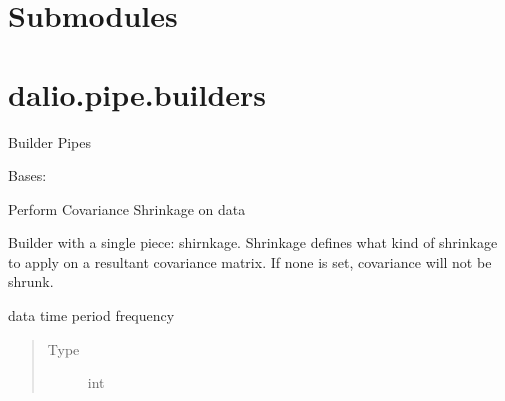 \documentclass[letterpaper,10pt,english]{sphinxmanual}
\begin{document}
\section{Submodules}
\label{\detokenize{dalio.pipe:submodules}}

\section{dalio.pipe.builders}
\label{\detokenize{dalio.pipe:module-dalio.pipe.builders}}\label{\detokenize{dalio.pipe:dalio-pipe-builders}}
Builder Pipes

\begin{fulllineitems}
\label{\detokenize{dalio.pipe:dalio.pipe.builders.CovShrink}}
Bases: {\hyperref[\detokenize{dalio.pipe:dalio.pipe.pipe.PipeBuilder}]{}}

Perform Covariance Shrinkage on data

Builder with a single piece: shirnkage. Shrinkage defines what kind of
shrinkage to apply on a resultant covariance matrix. If none is set,
covariance will not be shrunk.

\begin{fulllineitems}
\label{\detokenize{dalio.pipe:dalio.pipe.builders.CovShrink.frequency}}
data time period frequency
\begin{quote}\begin{description}
\item[{Type}] \leavevmode
int

\end{description}\end{quote}

\end{fulllineitems}



\end{fulllineitems}
\end{document}
